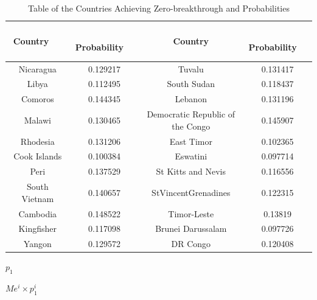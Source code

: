 \documentclass{mcmthesis}
\begin{document}
\begin{table}
\centering
\caption{Table of the Countries Achieving Zero-breakthrough and  Probabilities}
\begin{tabular}{|c|c|c|c|} 
\hline
\textbf{~ ~ ~ Country~ ~ ~~} & \textbf{~ Probability~~} & \textbf{Country}                 & \textbf{~ Probability~~}  \\ 
\hline
Nicaragua                    & 0.129217                 & Tuvalu                           & 0.131417                  \\ 
\hline
Libya                        & 0.112495                 & South Sudan                      & 0.118437                  \\ 
\hline
Comoros                      & 0.144345                 & Lebanon                          & 0.131196                  \\ 
\hline
Malawi                       & 0.130465                 & Democratic Republic of the Congo & 0.145907                  \\ 
\hline
Rhodesia                     & 0.131206                 & East Timor                       & 0.102365                  \\ 
\hline
Cook Islands                 & 0.100384                 & Eswatini                         & 0.097714                  \\ 
\hline
Peri                         & 0.137529                 & St Kitts and Nevis               & 0.116556                  \\ 
\hline
South Vietnam                & 0.140657                 & StVincentGrenadines              & 0.122315                  \\ 
\hline
Cambodia                     & 0.148522                 & Timor-Leste                      & 0.13819                   \\ 
\hline
Kingfisher                   & 0.117098                 & Brunei Darussalam                & 0.097726                  \\ 
\hline
Yangon                       & 0.129572                 & DR Congo                         & 0.120408                  \\
\hline
\end{tabular}
\end{table}

$p_{1}$

$Me^{i}\times p_{1}^{i}$
\end{document}
